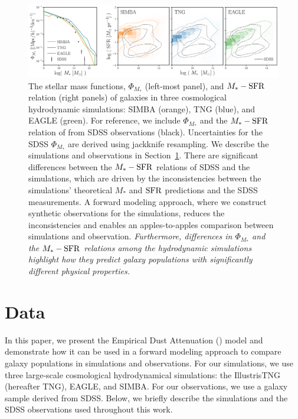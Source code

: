 \begin{figure}
\begin{center}
    \includegraphics[width=\textwidth]{figs/smf_m_sfr.pdf}
    \caption{\label{fig:smf_msfr}
    The stellar mass functions, $\Phi_{M_*}$ (left-most panel), and $M_*-{\rm SFR}$
    relation (right panels) of galaxies in three cosmological hydrodynamic 
    simulations: SIMBA (orange), TNG (blue), and EAGLE (green). 
    For reference, we include $\Phi_{M_*}$ and the $M_*-{\rm SFR}$ relation of from
    SDSS observations (black).
    Uncertainties for the SDSS $\Phi_{M_*}$ are derived using jackknife
    resampling. 
    We describe the simulations and observations in Section~\ref{sec:sims}. 
    There are significant differences between the $M_*-{\rm SFR}$ relations of
    SDSS and the simulations, which are driven by the inconsistencies
    between the simulations' theoretical $M_*$ and ${\rm SFR}$ predictions
    and the SDSS measurements.
    A forward modeling approach, where we construct synthetic observations
    for the simulations, reduces the inconsistencies and enables an
    apples-to-apples comparison between simulations and observation. 
    \emph{Furthermore, differences
    in $\Phi_{M_*}$ and the $M_*-{\rm SFR}$ relations among the hydrodynamic simulations 
    highlight how they predict galaxy populations with significantly different
    physical properties.} 
    }
\end{center}
\end{figure}

\section{Data}\label{sec:sims}
In this paper, we present the Empirical Dust Attenuation (\eda) model and
demonstrate how it can be used in a forward modeling approach to compare galaxy
populations in simulations and observations. For our simulations, we use three large-scale
cosmological hydrodynamical simulations: the IllustrisTNG (hereafter TNG),
EAGLE, and SIMBA. For our observations, we use a galaxy sample derived from
SDSS. Below, we briefly describe the simulations and the SDSS observations used
throughout this work.

